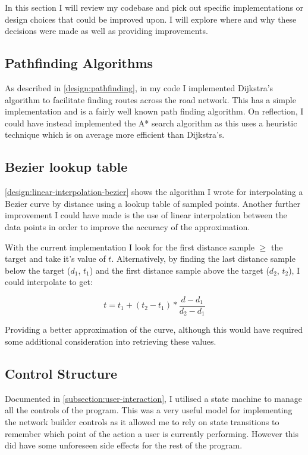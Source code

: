     In this section I will review my codebase and pick out specific implementations or design choices that could be improved upon. I will explore where and why these decisions were made as well as providing improvements.

    \subsection{Pathfinding Algorithms}

        As described in \autoref{design:pathfinding}, in my code I implemented Dijkstra's algorithm to facilitate finding routes across the road network. This has a simple implementation and is a fairly well known path finding algorithm. On reflection, I could have instead implemented the A* search algorithm as this uses a heuristic technique which is on average more efficient than Dijkstra's.

    \subsection{Bezier lookup table}

        \autoref{design:linear-interpolation-bezier} shows the algorithm I wrote for interpolating a Bezier curve by distance using a lookup table of sampled points. Another further improvement I could have made is the use of linear interpolation between the data points in order to improve the accuracy of the approximation.

        With the current implementation I look for the first distance sample $\geq$ the target and take it's value of $t$. Alternatively, by finding the last distance sample below the target ($d_1$, $t_1$) and the first distance sample above the target ($d_2$, $t_2$), I could interpolate to get:

        \[t = t_1 + (t_2 - t_1) * \frac{d - d_1}{d_2 - d_1}\]

        Providing a better approximation of the curve, although this would have required some additional consideration into retrieving these values.

    \subsection{Control Structure}

        Documented in \autoref{subsection:user-interaction}, I utilised a state machine to manage all the controls of the program. This was a very useful model for implementing the network builder controls as it allowed me to rely on state transitions to remember which point of the action a user is currently performing. However this did have some unforeseen side effects for the rest of the program.

